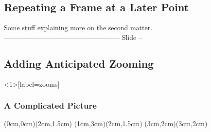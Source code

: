  \subsection{Repeating a Frame at a Later Point}
 \frame
 {
   Some stuff explaining more on the second matter.
 }
 --------------------------------------------------- Slide --
 \subsection{Adding Anticipated Zooming}
 \begin{frame}<1>[label=zooms]
   \frametitle<1>{A Complicated Picture}
   (0cm,0cm)(2cm,1.5cm)
   (1cm,3cm)(2cm,1.5cm)
   (3cm,2cm)(3cm,2cm)
 \end{frame}
